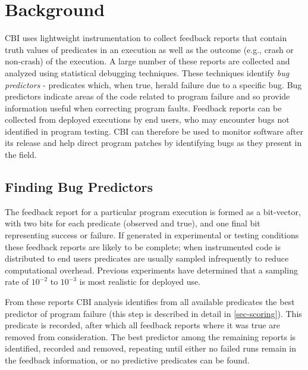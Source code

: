 
\newcommand{\rhythmbox}{\textsc{Rhythmbox}\xspace}

\section{Background}
\label{sec-bground}
CBI uses lightweight instrumentation to collect feedback reports that contain truth values of predicates in an execution as well as the outcome (e.g., crash or non-crash) of the execution.  A large number of these reports are collected and analyzed using statistical debugging techniques.  These techniques identify \emph{bug predictors} - predicates which, when true, herald failure due to a specific bug.  Bug predictors indicate areas of the code related to program failure and so provide information useful when correcting program faults.  Feedback reports can be collected from deployed executions by end users, who may encounter bugs not identified in program testing.  CBI can therefore be used to monitor software after its release and help direct program patches by identifying bugs as they present in the field.

\subsection{Finding Bug Predictors}
\label{sec-elimalg}
The feedback report for a particular program execution is formed as a bit-vector, with two bits for each predicate (observed and true), and one final bit representing success or failure.  If generated in experimental or testing conditions these feedback reports are likely to be complete; when instrumented code is distributed to end users predicates are usually sampled infrequently to reduce computational overhead.  Previous experiments \cite{Liblit:2003:BIRPS} have determined that a sampling rate of $10^{-2}$ to $10^{-3}$ is most realistic for deployed use.

From these reports CBI analysis identifies from all available predicates the best predictor of program failure (this step is described in detail in \autoref{sec-scoring}).  This predicate is recorded, after which all feedback reports where it was true are removed from consideration.  The best predictor among the remaining reports is identified, recorded and removed, repeating until either no failed runs remain in the feedback information, or no predictive predicates can be found.

